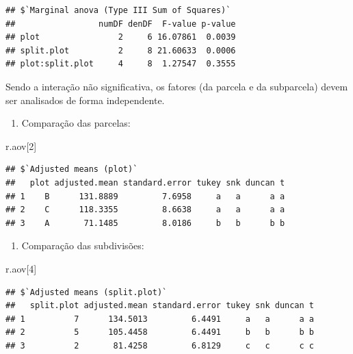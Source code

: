 \documentclass[
]{article}
\newenvironment{Shaded}{\begin{snugshade}}{\end{snugshade}}
\newcommand{\DecValTok}[1]{\textcolor[rgb]{0.00,0.00,0.81}{#1}}
\newcommand{\NormalTok}[1]{#1}
\providecommand{\tightlist}{%
  \setlength{\itemsep}{0pt}\setlength{\parskip}{0pt}}
\begin{document}
\begin{verbatim}
## $`Marginal anova (Type III Sum of Squares)`
##                 numDF denDF  F-value p-value
## plot                2     6 16.07861  0.0039
## split.plot          2     8 21.60633  0.0006
## plot:split.plot     4     8  1.27547  0.3555
\end{verbatim}

Sendo a interação não significativa, os fatores (da parcela e da subparcela) devem ser analisados de forma independente.

\begin{enumerate}
\def\labelenumi{\arabic{enumi}.}
\tightlist
\item
  Comparação das parcelas:
\end{enumerate}

\begin{Shaded}
\begin{Highlighting}[]
\NormalTok{r.aov[}\DecValTok{2}\NormalTok{]}
\end{Highlighting}
\end{Shaded}

\begin{verbatim}
## $`Adjusted means (plot)`
##   plot adjusted.mean standard.error tukey snk duncan t
## 1    B      131.8889         7.6958     a   a      a a
## 2    C      118.3355         8.6638     a   a      a a
## 3    A       71.1485         8.0186     b   b      b b
\end{verbatim}

\begin{enumerate}
\def\labelenumi{\arabic{enumi}.}
\setcounter{enumi}{1}
\tightlist
\item
  Comparação das subdivisões:
\end{enumerate}

\begin{Shaded}
\begin{Highlighting}[]
\NormalTok{r.aov[}\DecValTok{4}\NormalTok{]}
\end{Highlighting}
\end{Shaded}

\begin{verbatim}
## $`Adjusted means (split.plot)`
##   split.plot adjusted.mean standard.error tukey snk duncan t
## 1          7      134.5013         6.4491     a   a      a a
## 2          5      105.4458         6.4491     b   b      b b
## 3          2       81.4258         6.8129     c   c      c c
\end{verbatim}
\end{document}
